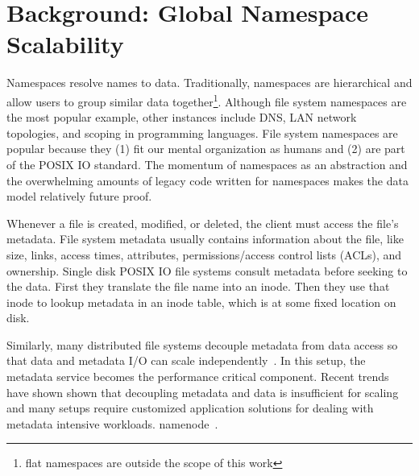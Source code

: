 \chapter{Background: Global Namespace Scalability}
\label{related-work}

Namespaces resolve names to data. Traditionally, namespaces are hierarchical
and allow users to group similar data together\footnote{flat namespaces are outside the
scope of this work}. Although file system namespaces are the most popular example, other
instances include DNS, LAN network topologies, and scoping in programming
languages.  File system namespaces are popular because they (1) fit our mental
organization as humans and (2) are part of the POSIX IO standard. The momentum of
namespaces as an abstraction and the overwhelming amounts of legacy code
written for namespaces makes the data model relatively future proof.

Whenever a file is created, modified, or deleted, the client must access the
file's metadata. File system metadata usually contains information about the
file, like size, links, access times, attributes, permissions/access control
lists (ACLs), and ownership.  Single disk POSIX IO file systems consult
metadata before seeking to the data.  First they translate the file name into
an inode. Then they use that inode to lookup metadata in an inode table, which
is at some fixed location on disk.  

Similarly, many distributed file systems decouple metadata from data access so
that data and metadata I/O can scale
independently~\cite{alam:pdsw2011-metadata-scaling, ghemawat:sosp2003-gfs,
hildebrand:msst2005-pnfs, weil:osdi2006-ceph, welch:fast2008-panasas,
xing:sc2009-skyfs}.  In this setup, the metadata service becomes the
performance critical component.  Recent trends have shown shown that decoupling
metadata and data is insufficient for scaling and many setups require
customized application solutions for dealing with metadata intensive workloads.
namenode~\cite{thusoo:sigmod2010-facebook-infrastructure}. 


